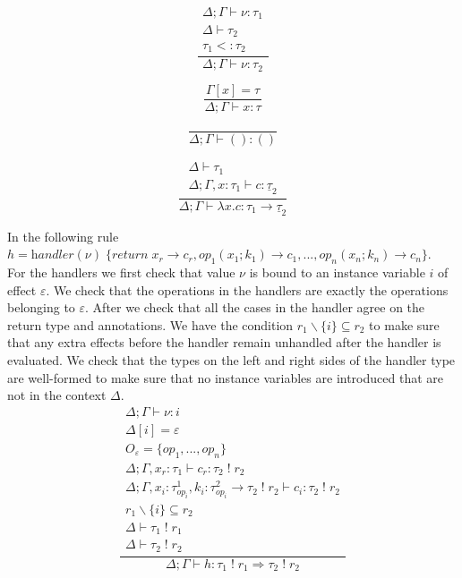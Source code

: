 \documentclass[12pt]{article}
\newcommand\eff[0]{\varepsilon}
\newcommand\Op[0]{O}
\newcommand\op[0]{op}
\newcommand\pty[1]{\ty^1_{#1}}
\newcommand\rty[1]{\ty^2_{#1}}
\newcommand\ty[0]{\tau}
\newcommand\tunit[0]{()}
\newcommand\tarr[2]{#1 \rightarrow #2}
\newcommand\thandler[2]{#1 \Rightarrow #2}
\newcommand\cty[0]{\underline{\ty}}
\newcommand\aty[2]{#1 \; ! \; #2}
\newcommand\val[0]{\nu}
\newcommand\vunit[0]{()}
\newcommand\vabs[2]{\lambda #1 . #2}
\newcommand\vhandleri[2]{\textit{handler} ( #1 ) \; \{#2\}}
\newcommand\comp[0]{c}
\newcommand\subty[2]{#1 <: #2}
\begin{document}
\begin{minipage}{0.25\textwidth}
\[\frac{
	\begin{array}{l}
	\Delta;\Gamma \vdash \val : \ty_1 \\
	\Delta \vdash \ty_2 \\
	\subty{\ty_1}{\ty_2}
	\end{array}
}{
	\Delta;\Gamma \vdash \val : \ty_2
}\]
\end{minipage}
\begin{minipage}{0.25\textwidth}
\[\frac{
	\Gamma[x] = \ty
}{
	\Delta;\Gamma \vdash x : \ty
}\]
\end{minipage}
\begin{minipage}{0.25\textwidth}
\[\frac{
}{
	\Delta;\Gamma \vdash \vunit : \tunit
}\]
\end{minipage}
\begin{minipage}{0.25\textwidth}
\[\frac{
	\begin{array}{l}
	\Delta \vdash \ty_1 \\
	\Delta;\Gamma, x : \ty_1 \vdash \comp : \cty_2
	\end{array}
}{
	\Delta;\Gamma \vdash \vabs{x}{\comp} : \tarr{\ty_1}{\cty_2}
}\]
\end{minipage}

\vspace{10pt}
In the following rule \\$h = 
	\vhandleri{\val}{
		\textit{return} \; x_r \rightarrow \comp_r,
		\op_1(x_1 ; k_1) \rightarrow \comp_1,
		...,
		\op_n(x_n ; k_n) \rightarrow \comp_n
	}$.\\
For the handlers we first check that value $\val$ is bound to an instance variable $i$ of effect $\eff$.
We check that the operations in the handlers are exactly the operations belonging to $\eff$.
After we check that all the cases in the handler agree on the return type and annotations.
We have the condition $r_1 \backslash \{ i \} \subseteq r_2$ to make sure that any extra effects before the handler remain unhandled after the handler is evaluated.
We check that the types on the left and right sides of the handler type are well-formed to make sure that no instance variables are introduced that are not in the context $\Delta$.
\[\frac{
	\begin{array}{l}
	\Delta;\Gamma \vdash \val : i \\
	\Delta[i] = \eff \\
	\Op_\eff = \{ op_1, ..., op_n \} \\
	\Delta;\Gamma, x_r : \ty_1 \vdash \comp_r : \aty{\ty_2}{r_2} \\
	\Delta;\Gamma, x_i : \pty{\op_i}, k_i : \tarr{\rty{\op_i}}{\aty{\ty_2}{r_2}} \vdash \comp_i : \aty{\ty_2}{r_2} \\
	r_1 \backslash \{ i \} \subseteq r_2 \\
	\Delta \vdash \aty{\ty_1}{r_1} \\
	\Delta \vdash \aty{\ty_2}{r_2}
	\end{array}
}{
	\Delta;\Gamma \vdash h :
	\thandler{\aty{\ty_1}{r_1}}{\aty{\ty_2}{r_2}}
}\]
\end{document}
